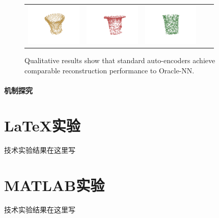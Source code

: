 \documentclass[bachelor, nocolorlinks, printoneside]{seuthesis} %
\begin{document}
\begin{Main}
\begin{figure}[!h]
\begin{tabular}{c@{}c@{}c@{}c@{}c@{}}
    	\includegraphics[width=0.22\columnwidth,height=2cm]{figs/real_dataset/AE_label/jar_d56098d4d83f5976a2c59a4d90e63212_fine.png} &
    	\includegraphics[width=0.22\columnwidth,height=2cm]{figs/real_dataset/AE/jar_d56098d4d83f5976a2c59a4d90e63212_fine.png} &
    	\includegraphics[width=0.22\columnwidth,height=2cm]{figs/real_dataset/oracle/jar_d56098d4d83f5976a2c59a4d90e63212_oracle.png}
    	\\
    \end{tabular}
    \caption{\small Qualitative results show that standard auto-encoders achieve comparable reconstruction performance to Oracle-NN. }
    \label{fig:visualize_KC}
\end{figure}

\FloatBarrier
\subsubsection{机制探究}



\end{Main} %




\begin{Appendix}{}
    \chapter{{\LaTeX}实验}
    技术实验结果在这里写
    \chapter{MATLAB实验}
    技术实验结果在这里写
\end{Appendix}
\end{document}
